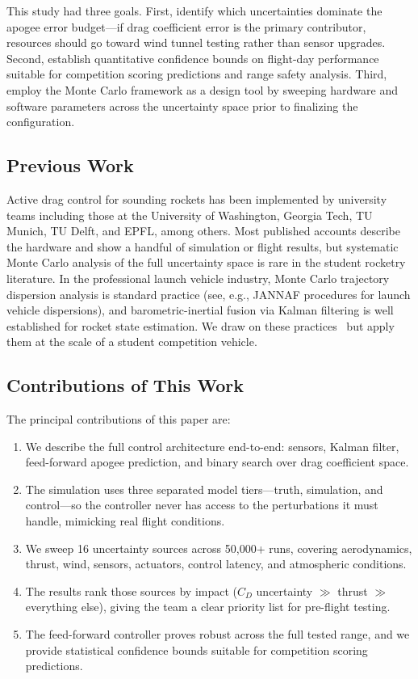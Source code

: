 \documentclass[11pt,letterpaper]{article}
\newcommand{\Cd}{C_D}
\begin{document}
This study had three goals. First, identify which uncertainties dominate the apogee error budget---if drag coefficient error is the primary contributor, resources should go toward wind tunnel testing rather than sensor upgrades. Second, establish quantitative confidence bounds on flight-day performance suitable for competition scoring predictions and range safety analysis. Third, employ the Monte Carlo framework as a design tool by sweeping hardware and software parameters across the uncertainty space prior to finalizing the configuration.

\subsection{Previous Work}
\label{sec:intro_previous}

Active drag control for sounding rockets has been implemented by university teams including those at the University of Washington, Georgia Tech, TU Munich, TU Delft, and EPFL, among others. Most published accounts describe the hardware and show a handful of simulation or flight results, but systematic Monte Carlo analysis of the full uncertainty space is rare in the student rocketry literature. In the professional launch vehicle industry, Monte Carlo trajectory dispersion analysis is standard practice (see, e.g., JANNAF procedures for launch vehicle dispersions), and barometric-inertial fusion via Kalman filtering is well established for rocket state estimation. We draw on these practices~\cite{gelb1974,simon2006,kroese2011} but apply them at the scale of a student competition vehicle.

\subsection{Contributions of This Work}
\label{sec:intro_contributions}

The principal contributions of this paper are:

\begin{enumerate}[label=(\arabic*)]
    \item We describe the full control architecture end-to-end: sensors, Kalman filter, feed-forward apogee prediction, and binary search over drag coefficient space.
    \item The simulation uses three separated model tiers---truth, simulation, and control---so the controller never has access to the perturbations it must handle, mimicking real flight conditions.
    \item We sweep 16 uncertainty sources across 50{,}000+ runs, covering aerodynamics, thrust, wind, sensors, actuators, control latency, and atmospheric conditions.
    \item The results rank those sources by impact ($\Cd$ uncertainty $\gg$ thrust $\gg$ everything else), giving the team a clear priority list for pre-flight testing.
    \item The feed-forward controller proves robust across the full tested range, and we provide statistical confidence bounds suitable for competition scoring predictions.
\end{enumerate}
\end{document}
